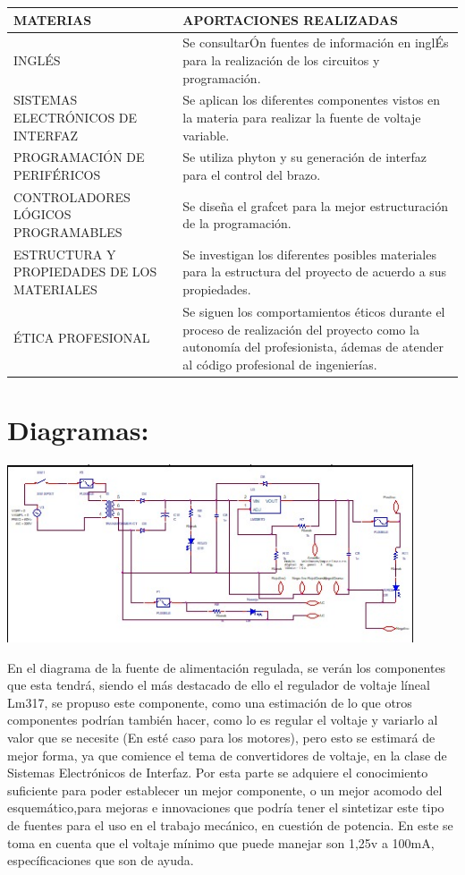 \documentclass[14pt,a4paper]{article}
\begin{document}
\begin{tabular}{|p{70mm}|p{70mm}|} 

\hline
	MATERIAS & APORTACIONES REALIZADAS\\
\hline
	INGLÉS & Se consultarÓn fuentes de información en inglÉs para la realización de los circuitos y programación.\\
\hline
	SISTEMAS ELECTRÓNICOS DE INTERFAZ & Se aplican los diferentes componentes vistos en la materia para realizar la fuente de voltaje variable.\\
\hline
	PROGRAMACIÓN DE PERIFÉRICOS & Se utiliza phyton y su generación de interfaz para el control del brazo.\\
\hline
	CONTROLADORES LÓGICOS PROGRAMABLES & Se diseña el grafcet para la mejor estructuración de la programación.\\
\hline
	ESTRUCTURA Y PROPIEDADES DE LOS MATERIALES & Se investigan los diferentes posibles materiales para la estructura del proyecto de acuerdo a sus propiedades.  \\
\hline
	ÉTICA PROFESIONAL & Se siguen los comportamientos éticos durante el proceso de realización del proyecto como la autonomía del profesionista, ádemas de atender al código profesional de ingenierías.  \\
\hline
\end{tabular}


\section{Diagramas:}

\begin{center}
\includegraphics[width=12cm]{Fuente.jpeg} 
\end{center}

En el diagrama de la fuente de alimentación regulada, se verán los componentes que esta tendrá, siendo el más destacado de ello el regulador de voltaje líneal Lm317, se propuso este componente, como una estimación de lo que otros componentes podrían también hacer, como lo es regular el voltaje y variarlo al valor que se necesite (En esté caso para los motores), pero esto se estimará de mejor forma, ya que comience el tema de convertidores de voltaje, en la clase de Sistemas Electrónicos de Interfaz. Por esta parte se adquiere el conocimiento suficiente para poder establecer un mejor componente, o un mejor acomodo del esquemático,para mejoras e innovaciones que podría tener el sintetizar este tipo de fuentes para el uso en el trabajo mecánico, en cuestión de potencia. En este se toma en cuenta que el voltaje mínimo que puede manejar son 1,25v a 100mA, específicaciones que son de ayuda.\\
\end{document}
